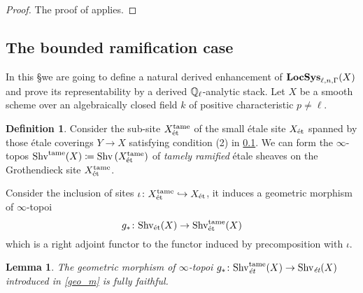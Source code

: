 \documentclass[10pt,a4paper]{amsart}
\numberwithin{equation}{subsection}
\theoremstyle{plain}
\newtheorem{lemma}[theorem]{Lemma}
\theoremstyle{definition}
\newtheorem{defi}[theorem]{Definition}
\theoremstyle{remark}
\numberwithin{equation}{section}
\begin{document}
\begin{proof}
The proof of \cite[Proposition 4.4.9]{me1} applies.
\end{proof}

\subsection{The bounded ramification case} In this \S we are going to define a natural derived enhancement of $\mathbf{LocSys}_{\ell, n, \Gamma}(X)$ and prove its representability by a derived $\mathbb Q_\ell$-analytic stack. Let $X$ be a smooth scheme over an algebraically closed field
$k$ of positive characteristic $p \neq \ell$.


\begin{defi}Consider the sub-site $X^{\mathrm{tame}}_{ \text{\'et}}$ of the small \'etale site $X_{\text{\'et}}$ spanned by those \'etale coverings $Y \to X$ satisfying condition (2) in \cref{}. We can form the $\infty$-topos $\mathrm{Shv}^{\mathrm{tame}}(X) \coloneqq \mathrm{Shv} \left( X^{\mathrm{tame}}_{\text{\'et}} \right)$
of \emph{tamely ramified} \'etale sheaves on the Grothendieck site $X^{\mathrm{tame}}_{\text{\'et}}$.
\end{defi}

Consider the inclusion of sites $ \iota \colon X^{\mathrm{tame}}_{\text{\'et}} \hookrightarrow X_{\text{\'et}}$, it induces a geometric morphism of $\infty$-topoi
	\begin{equation} \label{geo_m}
		g_* \colon \mathrm{Shv}_{\text{\'et}}(X) \to \mathrm{Shv}^{\mathrm{tame}}_{\text{\'et}}(X)
	\end{equation}
which is a right adjoint functor to the functor induced by precomposition with $\iota$.

\begin{lemma}
The geometric morphism of $\infty$-topoi $g_* \colon \mathrm{Shv}^{\mathrm{tame}}_{\emph{\text{\'et}}}(X) \to \mathrm{Shv}_{\emph{\text{\'et}}}(X)$ introduced in \eqref{geo_m} is fully faithful.
\end{lemma}
\end{document}
